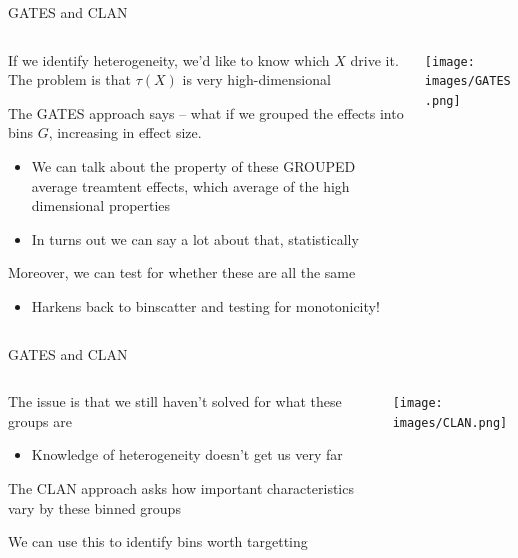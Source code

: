 \documentclass[notes,11pt, aspectratio=169]{beamer}
\newenvironment{wideitemize}{\itemize\addtolength{\itemsep}{10pt}}{\enditemize}
\begin{document}
\begin{frame}{GATES and CLAN}
    \begin{columns}[onlytextwidth, T] %
      \begin{column}{.5\textwidth}
  \begin{wideitemize}
  \item If we identify heterogeneity, we'd like to know which $X$
    drive it.  The problem is that $\tau(X)$ is very high-dimensional
  \item The GATES approach says -- what if we grouped the effects into
    bins $G$, increasing in effect size.
    \begin{itemize}
    \item We can talk about the property of these GROUPED average treamtent effects, which average of the high dimensional properties
    \item In turns out we can say a lot about that, statistically
    \end{itemize}
  \item Moreover, we can test for whether these are all the same
    \begin{itemize}
    \item Harkens back to binscatter and testing for monotonicity!
    \end{itemize}
  \end{wideitemize}
      \end{column}%
      \hfill%
      \begin{column}{.5\textwidth}
        \texttt{[image: images/GATES.png]}
      \end{column}%
    \end{columns}
\end{frame}

\begin{frame}{GATES and CLAN}
    \begin{columns}[onlytextwidth, T] %
      \begin{column}{.5\textwidth}
  \begin{wideitemize}
  \item The issue is that we still haven't solved for what these groups are
    \begin{itemize}
    \item Knowledge of heterogeneity doesn't get us very far
    \end{itemize}
  \item The CLAN approach asks how important characteristics vary by
    these binned groups
  \item We can use this to identify bins worth targetting
  \end{wideitemize}
      \end{column}%
      \hfill%
      \begin{column}{.5\textwidth}
        \texttt{[image: images/CLAN.png]}
      \end{column}%
    \end{columns}
\end{frame}
\end{document}

